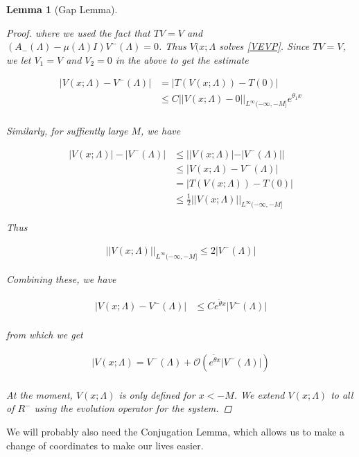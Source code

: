 \documentclass[12pt]{article}
\newtheorem{lemma}{Lemma}
\begin{document}
\begin{lemma}[Gap Lemma]
\begin{proof}
where we used the fact that $TV = V$ and $(A_-(\Lambda) - \mu(\Lambda)I)V^-(\Lambda) = 0$. Thus $V(x; \Lambda$ solves \eqref{VEVP}. Since $TV = V$, we let $V_1 = V$ and $V_2 = 0$ in the above to get the estimate

\begin{align*}
|V(x; \Lambda) - V^-(\Lambda)| &= |T(V(x; \Lambda)) - T(0)| \\
&\leq C ||V(x; \Lambda) - 0||_{L^\infty(-\infty, -M]} e^{\theta_1 x} \\
\end{align*}

Similarly, for suffiently large $M$, we have

\begin{align*}
|V(x; \Lambda)| - |V^-(\Lambda)| &\leq | |V(x; \Lambda)| - |V^-(\Lambda)| | \\
&\leq |V(x; \Lambda) - V^-(\Lambda)| \\
&= |T(V(x; \Lambda)) - T(0)| \\
&\leq \frac{1}{2} ||V(x; \Lambda)||_{L^\infty(-\infty, -M]}
\end{align*}

Thus

\begin{align*}
||V(x; \Lambda)||_{L^\infty(-\infty, -M]} \leq 2 |V^-(\Lambda)|
\end{align*}

Combining these, we have

\begin{align*}
|V(x; \Lambda) - V^-(\Lambda)| &\leq C e^{\tilde{\theta} x}|V^-(\Lambda)| \\
\end{align*}

from which we get

\begin{align*}
|V(x; \Lambda) = V^-(\Lambda) + \mathcal{O}( e^{\tilde{\theta} x}|V^-(\Lambda)| )\\
\end{align*}

At the moment, $V(x; \Lambda)$ is only defined for $x < -M$. We extend $V(x; \Lambda)$ to all of $R^-$ using the evolution operator for the system.

\end{proof}
\end{lemma}


We will probably also need the Conjugation Lemma, which allows us to make a change of coordinates to make our lives easier.
\end{document}
